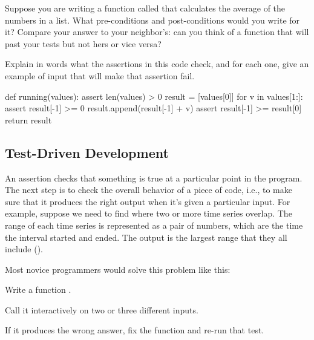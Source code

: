 \begin{challenge}
  Suppose you are writing a function called  that
  calculates the average of the numbers in a list. What pre-conditions
  and post-conditions would you write for it? Compare your answer to
  your neighbor's: can you think of a function that will past your tests
  but not hers or vice versa?
\end{challenge}

\begin{challenge}
  Explain in words what the assertions in this code check, and for each
  one, give an example of input that will make that assertion fail.

\begin{VerbIn}
def running(values):
    assert len(values) > 0
    result = [values[0]]
    for v in values[1:]:
        assert result[-1] >= 0
        result.append(result[-1] + v)
    assert result[-1] >= result[0]
    return result
\end{VerbIn}
\end{challenge}

\subsection{Test-Driven Development}

An assertion checks that something is true at a particular point in the
program. The next step is to check the overall behavior of a piece of
code, i.e., to make sure that it produces the right output when it's
given a particular input. For example, suppose we need to find where two
or more time series overlap. The range of each time series is
represented as a pair of numbers, which are the time the interval
started and ended. The output is the largest range that they all
include ().


Most novice programmers would solve this problem like this:

\begin{swcenumerate}
\item
  Write a function .
\item
  Call it interactively on two or three different inputs.
\item
  If it produces the wrong answer, fix the function and re-run that
  test.
\end{swcenumerate}

